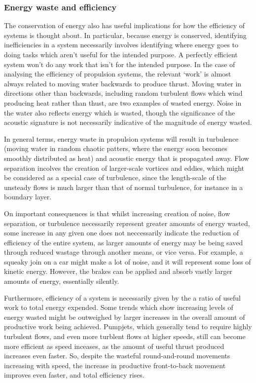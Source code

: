 \documentclass{article}\usepackage[]{graphicx}\usepackage[]{color}
\begin{document}
\begin{appendices}
\subsubsection{Energy waste and efficiency}
The conservation of energy also has useful implications for how the efficiency of systems is thought about.  In particular, because energy is conserved, identifying inefficiencies in a system necessarily involves identifying where energy goes to doing tasks which aren't useful for the intended purpose.  A perfectly efficient system won't do any work that isn't for the intended purpose.  In the case of analysing the efficiency of propulsion systems, the relevant `work' is almost always related to moving water backwards to produce thrust.  Moving water in directions other than backwards, including random turbulent flows which wind producing heat rather than thust, are two examples of wasted energy.  Noise in the water also reflects energy which is wasted, though the significance of the acoustic signature is not necessarily indicative of the magnitude of energy wasted.

In general terms, energy waste in propulsion systems will result in turbulence (moving water in random chaotic patters, where the energy soon becomes smoothly distributed as heat) and acoustic energy that is propagated away.  Flow separation incolves the creation of larger-scale vortices and eddies, which might be considered as a special case of turbulence, since the length-scale of the unsteady flows is much larger than that of normal turbulence, for instance in a boundary layer.

On important consequences is that whilst increasing creation of noise, flow separation, or turbulence necessarily represent greater amounts of energy wasted, some increase in any given one does not neccessarily indicate the reduction of efficiency of the entire system, as larger amounts of energy may be being saved through reduced wastage through another means, or vice versa. For example, a squeaky join on a car might make a lot of noise, and it will represent some loss of kinetic energy.  However, the brakes can be applied and absorb vastly larger amounts of energy, essentially silently.

Furthermore, efficiency of a system is necessarily given by the a ratio of useful work to total energy expended. Some trends which show increasing levels of energy wasted might be outweighed by larger increases in the overall amount of productive work being achieved.  Pumpjets, which generally tend to require highly turbulent flows, and even more turblent flows at higher speeds, still can become more efficient as speed inceases, as the amount of useful thrust produced increases even faster.  So, despite the wasteful round-and-round movements increasing with speed, the increase in productive front-to-back movement improves even faster, and total efficiency rises.


\end{appendices}
\end{document}
